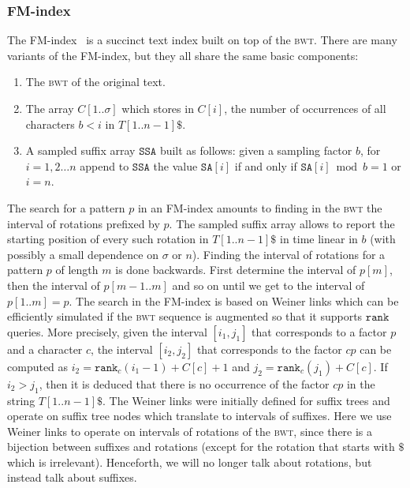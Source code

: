 \documentclass[a4paper]{article}
\begin{document}
\subsubsection{FM-index}
The FM-index~\cite{FM05} is a succinct text index built on top of the \textsc{bwt}. There are many variants of the FM-index, but they all share the same basic components: 
\begin{enumerate}
\item The \textsc{bwt} of the original text. 
\item The array $C[1..\sigma]$ which stores in $C[i]$, the number of occurrences of all characters $b<i$ in $T[1..n-1]\$$. 
\item A sampled suffix array $\mathtt{SSA}$ built as follows: given a sampling factor $b$, for $i=1,2\ldots n$ append to $\mathtt{SSA}$ the value $\mathtt{SA}[i]$ if and only if $\mathtt{SA}[i]\bmod b=1$ or $i=n$. 
\end{enumerate}
The search for a pattern $p$ in an FM-index amounts to finding in the \textsc{bwt} the interval of rotations prefixed 
by $p$. The sampled suffix array allows to report the starting position of every such rotation in $T[1..n-1]\$$ in time linear in $b$ (with possibly a small dependence on $\sigma$ or $n$). 
Finding the interval of rotations for a pattern $p$ of length $m$ is done backwards. First determine the interval of $p[m]$, then the interval of $p[m-1..m]$ and so on until we get to the interval of $p[1..m]=p$. 
The search in the FM-index is based on Weiner links which can be efficiently simulated if the \textsc{bwt} sequence is augmented so that it supports $\mathtt{rank}$ queries. More precisely, given the interval $[i_1,j_1]$ that corresponds to a factor $p$ and a character $c$, the interval $[i_2,j_2]$ that corresponds to the factor $cp$ can be computed as $i_2=\mathtt{rank}_c(i_1-1)+C[c]+1$  and 
$j_2=\mathtt{rank}_c(j_1)+C[c]$. If $i_2>j_1$, then it is deduced that there is no occurrence of the factor $cp$ in the string $T[1..n-1]\$$. The Weiner links were initially defined for suffix trees and operate on suffix tree nodes which translate to intervals of suffixes. Here we use Weiner links to operate on intervals of rotations of the \textsc{bwt}, since there is a bijection between suffixes and rotations (except for the rotation that starts with $\$$ which is irrelevant). Henceforth, we will no longer talk about rotations, but instead talk about suffixes. 
\end{document}
